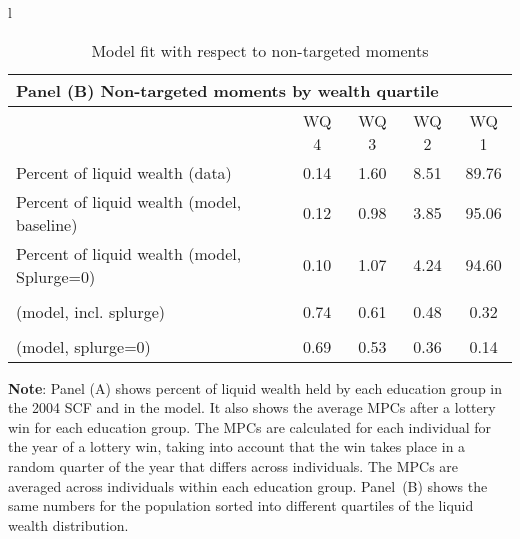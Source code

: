 \documentclass[\econtexRoot/HAFiscal-online-appendix]{subfiles}
\begin{document}
\begin{table}[th]
\begin{center}
\begin{tabular}{l}
			\begin{tabular}{lcccc}
				\multicolumn{5}{l}{Panel (B) Non-targeted moments by wealth quartile} \\ \midrule
				& WQ 4 & WQ 3 & WQ 2 & WQ 1 \\ \midrule
				Percent of liquid wealth (data) & 0.14 & 1.60 & 8.51 & 89.76 \\
				Percent of liquid wealth (model, baseline) & 0.12 & 0.98 & 3.85 & 95.06 \\
				Percent of liquid wealth (model, Splurge=0) & 0.10 & 1.07 & 4.24 & 94.60 \\
				\makecell[l]{Avg. lottery-win-year MPC \\ (model, incl. splurge)} & 0.74 & 0.61 & 0.48 & 0.32 \\
				\makecell[l]{Avg. lottery-win-year MPC \\ (model, splurge=0)} & 0.69 & 0.53 & 0.36 & 0.14
				\\ \bottomrule 
			\end{tabular}
		\end{tabular}
		\caption{Model fit with respect to non-targeted moments}
		\notinsubfile{\label{tab:nonTargetedMoments_wSplZero}}
		\parbox{16cm}{\small \vspace{.15cm} \textbf{Note}: Panel (A) shows percent of liquid wealth held by each education group in the 2004 SCF and in the model.
It also shows the average MPCs after a lottery win for each education group.
The MPCs are calculated for each individual for the year of a lottery win, taking into account that the win takes place in a random quarter of the year that differs across individuals.
The MPCs are averaged across individuals within each education group.
Panel~(B) shows the same numbers for the population sorted into different quartiles of the liquid wealth distribution.\normalsize}
	\end{center}
\end{table}
\end{document}
